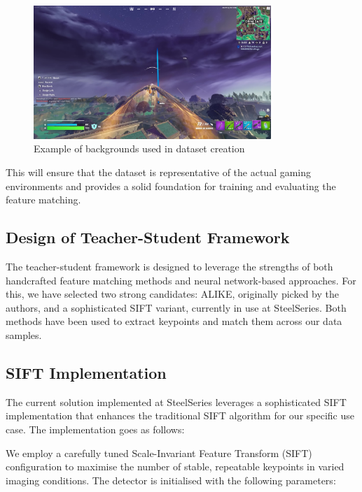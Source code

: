 \begin{figure}[H]
    \centering
    \includegraphics[width=0.8\textwidth]{ressources/bg_example.jpg}
    \caption{Example of backgrounds used in dataset creation}
    \label{fig:background_example}
\end{figure}

This will ensure that the dataset is representative of the actual gaming
environments and provides a solid foundation for training and evaluating the
feature matching.
\subsection{Design of Teacher-Student Framework}
The teacher-student framework is designed to leverage the strengths of both
handcrafted feature matching methods and neural network-based approaches. For
this, we have selected two strong candidates: ALIKE, originally picked by the
authors, and a sophisticated SIFT variant, currently in use at SteelSeries.
Both methods have been used to extract keypoints and match them across our data
samples.
\subsection{SIFT Implementation}
The current solution implemented at SteelSeries leverages a sophisticated SIFT
implementation that enhances the traditional SIFT algorithm for our specific
use case. The implementation goes as follows:

We employ a carefully tuned Scale-Invariant Feature Transform (SIFT)
configuration to maximise the number of stable, repeatable keypoints in varied
imaging conditions. The detector is initialised with the following parameters:


